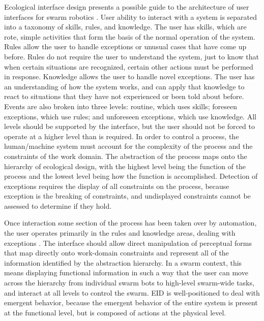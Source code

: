 \documentclass[]{article}
\begin{document}
Ecological interface design presents a possible guide to the architecture of user interfaces for swarm robotics \cite{vicente1992ecological}. 
User ability to interact with a system is separated into a taxonomy of skills, rules, and knowledge. 
The user has skills, which are rote, simple activities that form the basis of the normal operation of the system. 
Rules allow the user to handle exceptions or unusual cases that have come up before. 
Rules do not require the user to understand the system, just to know that when certain situations are recognized, certain other actions must be performed in response. 
Knowledge allows the user to handle novel exceptions. 
The user has an understanding of how the system works, and can apply that knowledge to react to situations that they have not experienced or been told about before. 
Events are also broken into three levels: routine, which uses skills; foreseen exceptions, which use rules; and unforeseen exceptions, which use knowledge. 
All levels should be supported by the interface, but the user should not be forced to operate at a higher level than is required. 
In order to control a process, the human/machine system must account for the complexity of the process and the constraints of the work domain. 
The abstraction of the process maps onto the hierarchy of ecological design, with the highest level being the function of the process and the lowest level being how the function is accomplished. 
Detection of exceptions requires the display of all constraints on the process, because exception is the breaking of constraints, and undisplayed constraints cannot be assessed to determine if they hold.

Once interaction some section of the process has been taken over by automation, the user operates primarily in the rules and knowledge areas, dealing with exceptions \cite{vicente2002ecological}.
The interface should allow direct manipulation of perceptual forms that map directly onto work-domain constraints and represent all of the information identified by the abstraction hierarchy. 
In a swarm context, this means displaying functional information in such a way that the user can move across the hierarchy from individual swarm bots to high-level swarm-wide tasks, and interact at all levels to control the swarm. 
EID is well-positioned to deal with emergent behavior, because the emergent behavior of the entire system is present at the functional level, but is composed of actions at the physical level.  
\end{document}
